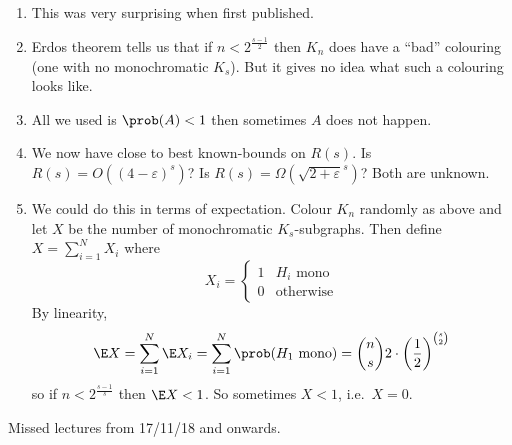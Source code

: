 \documentclass[a4paper]{article}
\renewcommand{\P}{\prob} %
\begin{document}
\begin{remark}\leavevmode
  \begin{enumerate}
  \item This was very surprising when first published.
  \item Erdos theorem tells us that if \(n < 2^{\frac{s - 1}{2}}\) then \(K_n\) does have a ``bad'' colouring (one with no monochromatic \(K_s\)). But it gives no idea what such a colouring looks like.
  \item All we used is \(\P(A) < 1\) then sometimes \(A\) does not happen.
  \item We now have close to best known-bounds on \(R(s)\). Is \(R(s) = O((4 - \varepsilon)^s)\)? Is \(R(s) = \Omega(\sqrt{2 + \varepsilon}^s)\)? Both are unknown.
  \item We could do this in terms of expectation. Colour \(K_n\) randomly as above and let \(X\) be the number of monochromatic \(K_s\)-subgraphs. Then define \(X = \sum_{i = 1}^N X_i\) where
    \[
      X_i =
      \begin{cases}
        1 & H_i \text{ mono} \\
        0 & \text{otherwise}
      \end{cases}
    \]
    By linearity,
    \[
      \E X = \sum_{i = 1}^N \E X_i = \sum_{i = 1}^N \P(H_1 \text{ mono}) = \binom{n}{s} 2\cdot \left(\frac{1}{2}\right)^{\binom{s}{2}}
    \]
    so if \(n < 2^{\frac{s - 1}{s}}\) then \(\E X < 1\). So sometimes \(X < 1\), i.e.\ \(X = 0\).
  \end{enumerate}
\end{remark}

Missed lectures from 17/11/18 and onwards.


\printindex
\end{document}
